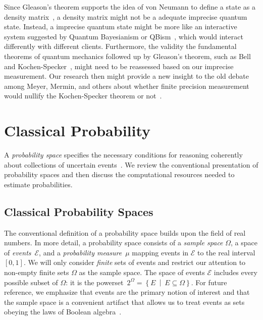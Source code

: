\documentclass[12pt]{iopart}
\theoremstyle{remark}
\newcommand{\events}{\ensuremath{\mathcal{E}}}
\newcommand{\pmeas}{\ensuremath{\mu}}
\newcommand{\set}[2]{\ensuremath{\left\{ {#1}~\middle|~{#2}\right\} }}
\begin{document}
Since Gleason's theorem supports the idea of von Neumann to define
a state as a density matrix~\cite{Varadarajan2008}, a density matrix
might not be a adequate imprecise quantum state. Instead, a imprecise
quantum state might be more like an interactive system suggested by
Quantum Bayesianism or QBism~\cite{Fuchs2010,VonBaeyer2016,Fuchs2012},
which would interact differently with different clients. Furthermore,
the validity the fundamental theorems of quantum mechanics followed
up by Gleason's theorem, such as Bell~\cite{Bell1964,Redhead1987-REDINA,peres1995quantum,Jaeger2007}
and Kochen-Specker~\cite{kochenspecker1967,Redhead1987-REDINA,peres1995quantum,Jaeger2007},
might need to be reassessed based on our imprecise measurement. Our
research then might provide a new insight to the old debate among
Meyer, Mermin, and others about whether finite precision measurement
would nullify the Kochen-Specker theorem or not~\cite{PhysRevLett.83.3751,Mermin1999,BarrettKent2004}.

\section{Classical Probability}

A \emph{probability space} specifies the necessary conditions for
reasoning coherently about collections of uncertain
events~\cite{Kolmogorov1950,Shafer1976,Griffiths2003,Swart2013}.  We
review the conventional presentation of probability spaces and then
discuss the computational resources needed to estimate probabilities.

\subsection{Classical Probability Spaces}

The conventional definition of a probability space builds upon the
field of real numbers. In more detail, a probability space consists
of a \emph{sample space} $\Omega$, a space of \emph{events}~$\events$,
and a \emph{probability measure}~$\pmeas$ mapping events in $\events$
to the real interval $[0,1]$. We will only consider \emph{finite}
sets of events and restrict our attention to non-empty finite sets
$\Omega$ as the sample space. The space of events $\events$ includes
every possible subset of $\Omega$: it is the powerset~$2^{\Omega}=\set{E}{E\subseteq\Omega}$.
For future reference, we emphasize that events are the primary notion
of interest and that the sample space is a convenient artifact that
allows us to treat events as sets obeying the laws of Boolean algebra~\cite{Boole1948,Redhead1987-REDINA,Griffiths2003}.
\end{document}
